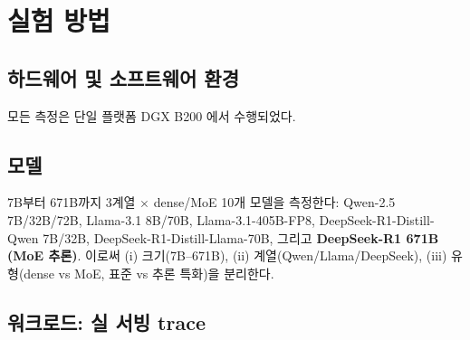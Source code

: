 
\section{실험 방법}
\label{sec:methodology}

\subsection{하드웨어 및 소프트웨어 환경}

모든 측정은 단일 플랫폼 DGX B200 에서 수행되었다.

\begin{table}[t]
\centering
\caption{실험 환경 (전 측정 B200 단일 플랫폼).}
\label{tbl:setup}
\footnotesize
{}
\end{table}

\subsection{모델}

7B부터 671B까지 3계열 $\times$ dense/MoE 10개 모델을 측정한다:
Qwen-2.5 7B/32B/72B, Llama-3.1 8B/70B, Llama-3.1-405B-FP8,
DeepSeek-R1-Distill-Qwen 7B/32B, DeepSeek-R1-Distill-Llama-70B,
그리고 \textbf{DeepSeek-R1 671B (MoE 추론)}.
이로써 (i) 크기(7B--671B), (ii) 계열(Qwen/Llama/DeepSeek),
(iii) 유형(dense vs MoE, 표준 vs 추론 특화)을 분리한다.

\subsection{워크로드: 실 서빙 trace}

